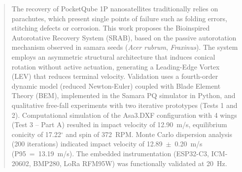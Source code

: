 \documentclass[12pt,fleqn]{article}
\begin{document}
\begin{abstract}
The recovery of PocketQube 1P nanosatellites traditionally relies on parachutes, which present single points of failure such as folding errors, stitching defects or corrosion. This work proposes the Bioinspired Autorotative Recovery System (SRAB), based on the passive autorotation mechanism observed in samara seeds (\textit{Acer rubrum}, \textit{Fraxinus}). The system employs an asymmetric structural architecture that induces conical rotation without active actuation, generating a Leading-Edge Vortex (LEV) that reduces terminal velocity. Validation uses a fourth-order dynamic model (reduced Newton-Euler) coupled with Blade Element Theory (BEM), implemented in the Samara PQ simulator in Python, and qualitative free-fall experiments with two iterative prototypes (Tests 1 and 2). Computational simulation of the Asa3.DXF configuration with 4 wings (Test 3 -- Part A) resulted in impact velocity of 12.90~m/s, equilibrium conicity of 17.22$^\circ$ and spin of 372~RPM. Monte Carlo dispersion analysis (200 iterations) indicated impact velocity of 12.89~$\pm$~0.20~m/s (P95~=~13.19~m/s). The embedded instrumentation (ESP32-C3, ICM-20602, BMP280, LoRa RFM95W) was functionally validated at 20~Hz.
\end{abstract}


\end{document}
